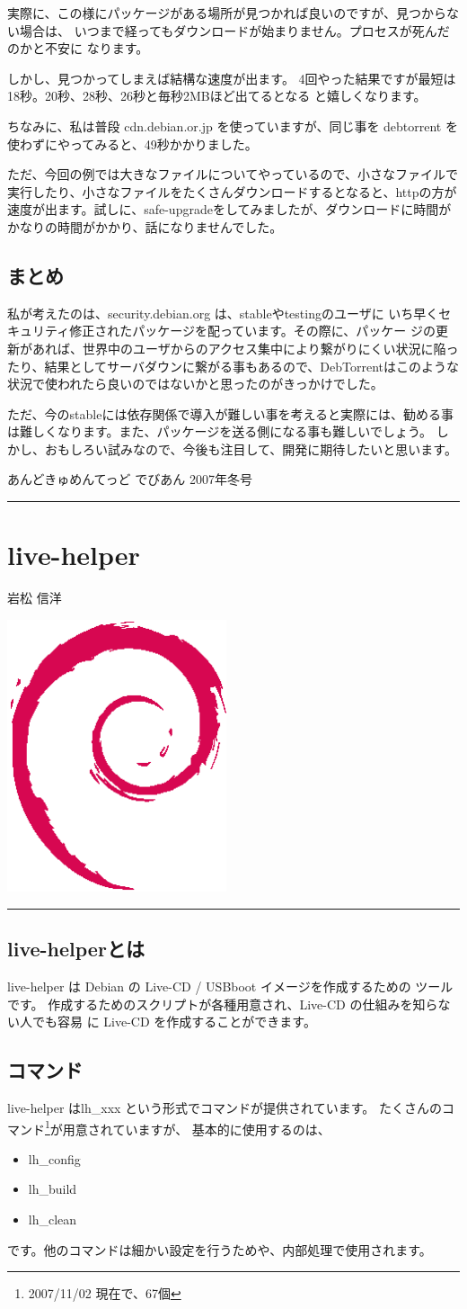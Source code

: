 \documentclass[mingoth,a4paper]{jsarticle}
\renewcommand{\dancersection}[2]{%
\newpage
あんどきゅめんてっど でびあん 2007年冬号
%
\vspace{0.1mm}\\
{\color{dancerlightblue}\rule{\hsize}{2mm}}

%
%
\begin{minipage}[t]{0.7\hsize}
\color{dancerdarkblue}
\vspace{1cm}
\section{#1}
\hfill{}#2\\
\end{minipage}
\begin{minipage}[t]{0.3\hsize}
\vspace{-2cm}
\hfill{}\includegraphics[height=8cm]{image200502/openlogo-nd.eps}\\
\vspace{-5cm}
\end{minipage}
%
%
{\color{dancerdarkblue}\rule{0.74\hsize}{2mm}}
%
\vspace{2cm}
}
\begin{document}
実際に、この様にパッケージがある場所が見つかれば良いのですが、見つからない場合は、
いつまで経ってもダウンロードが始まりません。プロセスが死んだのかと不安に
なります。

しかし、見つかってしまえば結構な速度が出ます。
4回やった結果ですが最短は18秒。20秒、28秒、26秒と毎秒2MBほど出てるとなる
と嬉しくなります。

ちなみに、私は普段 cdn.debian.or.jp を使っていますが、同じ事を debtorrent を
使わずにやってみると、49秒かかりました。

ただ、今回の例では大きなファイルについてやっているので、小さなファイルで
実行したり、小さなファイルをたくさんダウンロードするとなると、httpの方が
速度が出ます。試しに、safe-upgradeをしてみましたが、ダウンロードに時間が
かなりの時間がかかり、話になりませんでした。

\subsection{まとめ}

私が考えたのは、security.debian.org は、stableやtestingのユーザに
いち早くセキュリティ修正されたパッケージを配っています。その際に、パッケー
ジの更新があれば、世界中のユーザからのアクセス集中により繋がりにくい状況に陥っ
たり、結果としてサーバダウンに繋がる事もあるので、DebTorrentはこのような
状況で使われたら良いのではないかと思ったのがきっかけでした。

ただ、今のstableには依存関係で導入が難しい事を考えると実際には、勧める事
は難しくなります。また、パッケージを送る側になる事も難しいでしょう。
しかし、おもしろい試みなので、今後も注目して、開発に期待したいと思います。


\newpage
\dancersection{live-helper}{岩松 信洋}
\label{live-helper}
\subsection{live-helperとは}
live-helper は Debian の Live-CD / USBboot イメージを作成するための
ツールです。
作成するためのスクリプトが各種用意され、Live-CD の仕組みを知らない人でも容易
に Live-CD を作成することができます。

\subsection{コマンド}
live-helper はlh\_xxx という形式でコマンドが提供されています。
たくさんのコマンド\footnote{2007/11/02 現在で、67個}が用意されていますが、
基本的に使用するのは、
\begin{itemize}
  \item lh\_config
  \item lh\_build
  \item lh\_clean
\end{itemize}
です。他のコマンドは細かい設定を行うためや、内部処理で使用されます。
\end{document}

